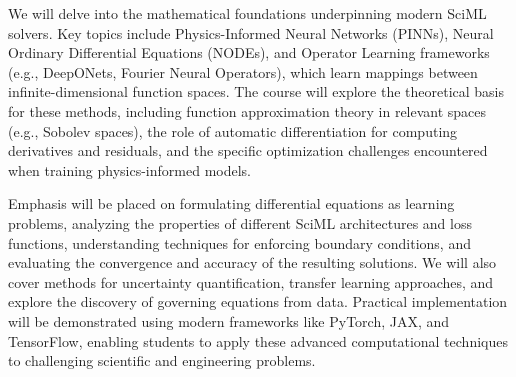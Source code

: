\documentclass[11pt,fourier]{article}
\begin{document}
	We will delve into the mathematical foundations underpinning modern SciML solvers. Key topics include Physics-Informed Neural Networks (PINNs), Neural Ordinary Differential Equations (NODEs), and Operator Learning frameworks (e.g., DeepONets, Fourier Neural Operators), which learn mappings between infinite-dimensional function spaces. The course will explore the theoretical basis for these methods, including function approximation theory in relevant spaces (e.g., Sobolev spaces), the role of automatic differentiation for computing derivatives and residuals, and the specific optimization challenges encountered when training physics-informed models.
	
	Emphasis will be placed on formulating differential equations as learning problems, analyzing the properties of different SciML architectures and loss functions, understanding techniques for enforcing boundary conditions, and evaluating the convergence and accuracy of the resulting solutions. We will also cover methods for uncertainty quantification, transfer learning approaches, and explore the discovery of governing equations from data. Practical implementation will be demonstrated using modern frameworks like PyTorch, JAX, and TensorFlow, enabling students to apply these advanced computational techniques to challenging scientific and engineering problems.
	
\end{document}
